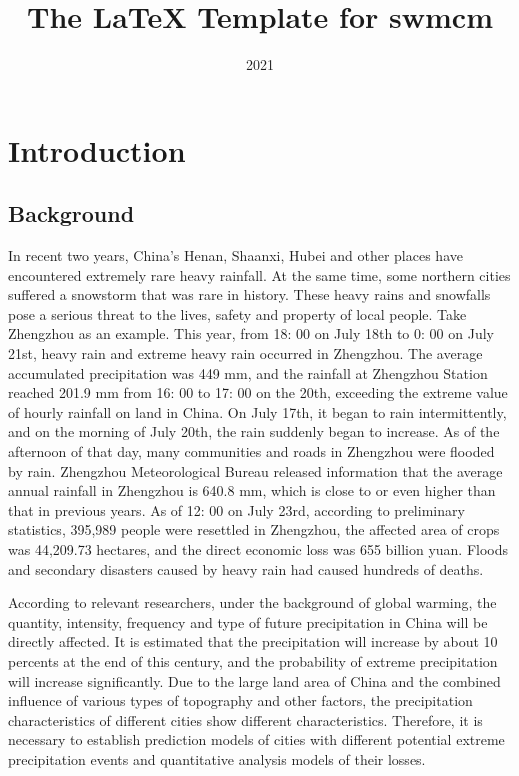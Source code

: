 \documentclass{swmcmthesis}
\title{The \LaTeX{} Template  for swmcm} %
\date{2021}
\begin{document}
\maketitle
\tableofcontents

\newpage


\section{Introduction}

\subsection{Background}
\hspace{1em}
In recent two years, China's Henan, Shaanxi, Hubei and other places have encountered extremely rare heavy rainfall. At the same time, some northern cities suffered a snowstorm that was rare in history. These heavy rains and snowfalls pose a serious threat to the lives, safety and property of local people. Take Zhengzhou as an example. This year, from 18: 00 on July 18th to 0: 00 on July 21st, heavy rain and extreme heavy rain occurred in Zhengzhou. The average accumulated precipitation was 449 mm, and the rainfall at Zhengzhou Station reached 201.9 mm from 16: 00 to 17: 00 on the 20th, exceeding the extreme value of hourly rainfall on land in China. On July 17th, it began to rain intermittently, and on the morning of July 20th, the rain suddenly began to increase. As of the afternoon of that day, many communities and roads in Zhengzhou were flooded by rain. Zhengzhou Meteorological Bureau released information that the average annual rainfall in Zhengzhou is 640.8 mm, which is close to or even higher than that in previous years. As of 12: 00 on July 23rd, according to preliminary statistics, 395,989 people were resettled in Zhengzhou, the affected area of crops was 44,209.73 hectares, and the direct economic loss was 655 billion yuan. Floods and secondary disasters caused by heavy rain had caused hundreds of deaths.
\par
According to relevant researchers, under the background of global warming, the quantity, intensity, frequency and type of future precipitation in China will be directly affected. It is estimated that the precipitation will increase by about 10 percents at the end of this century, and the probability of extreme precipitation will increase significantly. Due to the large land area of China and the combined influence of various types of topography and other factors, the precipitation characteristics of different cities show different characteristics. Therefore, it is necessary to establish prediction models of cities with different potential extreme precipitation events and quantitative analysis models of their losses.
\end{document}
